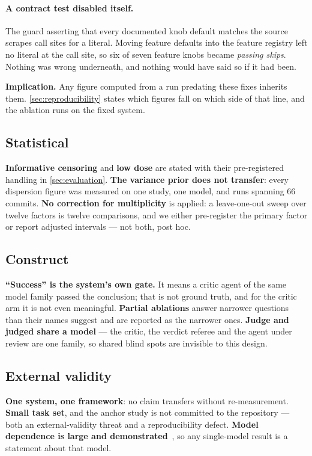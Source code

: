 \paragraph{A contract test disabled itself.}
The guard asserting that every documented knob default matches the source
scrapes call sites for a literal. Moving feature defaults into the feature
registry left no literal at the call site, so six of seven feature knobs became
\emph{passing skips}. Nothing was wrong underneath, and nothing would have said
so if it had been.

\textbf{Implication.} Any figure computed from a run predating these fixes
inherits them. \cref{sec:reproducibility} states which figures fall on which
side of that line, and the ablation runs on the fixed system.

\subsection{Statistical}

\textbf{Informative censoring} and \textbf{low dose} are stated with their
pre-registered handling in \cref{sec:evaluation}. \textbf{The variance prior
does not transfer}: every dispersion figure was measured on one study, one
model, and runs spanning 66 commits. \textbf{No correction for multiplicity} is
applied: a leave-one-out sweep over twelve factors is twelve comparisons, and
we either pre-register the primary factor or report adjusted intervals --- not
both, post hoc.

\subsection{Construct}

\textbf{``Success'' is the system's own gate.} It means a critic agent of the
same model family passed the conclusion; that is not ground truth, and for the
critic arm it is not even meaningful. \textbf{Partial ablations} answer
narrower questions than their names suggest and are reported as the narrower
ones. \textbf{Judge and judged share a model} --- the critic, the verdict
referee and the agent under review are one family, so shared blind spots are
invisible to this design.

\subsection{External validity}

\textbf{One system, one framework}: no claim transfers without re-measurement.
\textbf{Small task set}, and the anchor study is not committed to the
repository --- both an external-validity threat and a reproducibility defect.
\textbf{Model dependence is large and demonstrated}~\cite{abaqusagent2026}, so
any single-model result is a statement about that model.

